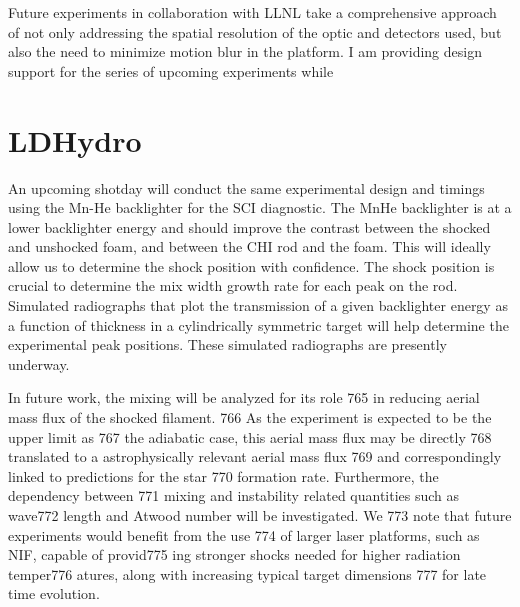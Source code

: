 Future experiments in collaboration with LLNL take a comprehensive approach of not only addressing the spatial resolution of the optic and detectors used, but also the need to minimize motion blur in the platform.  I am providing design support for the series of upcoming experiments while



\section{LDHydro}

An upcoming shotday will conduct the same experimental design and timings using the Mn-He backlighter for the SCI diagnostic.  The MnHe backlighter is at a lower backlighter energy and should improve the contrast between the shocked and unshocked foam, and between the CHI rod and the foam.  This will ideally allow us to determine the shock position with confidence.  The shock position is crucial to determine the mix width growth rate for each peak on the rod.  Simulated radiographs that plot the transmission of a given backlighter energy as a function of thickness in a cylindrically symmetric target will help determine the experimental peak positions. These simulated radiographs are presently underway. 



In future work, the mixing will be analyzed for its role
765 in reducing aerial mass flux of the shocked filament.
766 As the experiment is expected to be the upper limit as
767 the adiabatic case, this aerial mass flux may be directly
768 translated to a astrophysically relevant aerial mass flux
769 and correspondingly linked to predictions for the star
770 formation rate. Furthermore, the dependency between
771 mixing and instability related quantities such as wave772
length and Atwood number will be investigated. We
773 note that future experiments would benefit from the use
774 of larger laser platforms, such as NIF, capable of provid775
ing stronger shocks needed for higher radiation temper776
atures, along with increasing typical target dimensions
777 for late time evolution.








